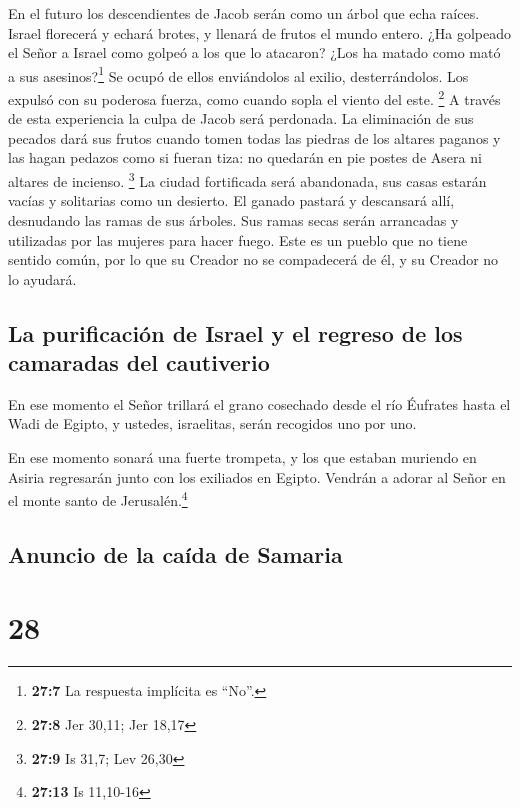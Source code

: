  En el futuro los descendientes de Jacob serán como un
árbol que echa raíces. Israel florecerá y echará brotes, y llenará de
frutos el mundo entero.  ¿Ha golpeado el Señor a Israel
como golpeó a los que lo atacaron? ¿Los ha matado como mató a sus
asesinos?\footnote{\textbf{27:7} La respuesta implícita es ``No''.}
 Se ocupó de ellos enviándolos al exilio, desterrándolos.
Los expulsó con su poderosa fuerza, como cuando sopla el viento del
este. \footnote{\textbf{27:8} Jer 30,11; Jer 18,17}  A
través de esta experiencia la culpa de Jacob será perdonada. La
eliminación de sus pecados dará sus frutos cuando tomen todas las
piedras de los altares paganos y las hagan pedazos como si fueran tiza:
no quedarán en pie postes de Asera ni altares de incienso. \footnote{\textbf{27:9}
  Is 31,7; Lev 26,30}  La ciudad fortificada será
abandonada, sus casas estarán vacías y solitarias como un desierto. El
ganado pastará y descansará allí, desnudando las ramas de sus árboles.
 Sus ramas secas serán arrancadas y utilizadas por las
mujeres para hacer fuego. Este es un pueblo que no tiene sentido común,
por lo que su Creador no se compadecerá de él, y su Creador no lo
ayudará.

\hypertarget{la-purificaciuxf3n-de-israel-y-el-regreso-de-los-camaradas-del-cautiverio}{%
\subsection{La purificación de Israel y el regreso de los camaradas del
cautiverio}\label{la-purificaciuxf3n-de-israel-y-el-regreso-de-los-camaradas-del-cautiverio}}

 En ese momento el Señor trillará el grano cosechado
desde el río Éufrates hasta el Wadi de Egipto, y ustedes, israelitas,
serán recogidos uno por uno.

 En ese momento sonará una fuerte trompeta, y los que
estaban muriendo en Asiria regresarán junto con los exiliados en Egipto.
Vendrán a adorar al Señor en el monte santo de Jerusalén.\footnote{\textbf{27:13}
  Is 11,10-16}

\hypertarget{anuncio-de-la-cauxedda-de-samaria}{%
\subsection{Anuncio de la caída de
Samaria}\label{anuncio-de-la-cauxedda-de-samaria}}

\hypertarget{section-27}{%
\section{28}\label{section-27}}

